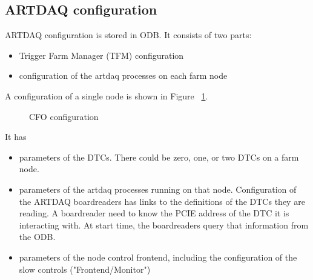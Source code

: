 \subsection{ARTDAQ configuration}

ARTDAQ configuration is stored in ODB. It consists of two parts:
\begin{itemize}
\item
  Trigger Farm Manager (TFM) configuration
\item
  configuration of the artdaq processes on each farm node
\end{itemize}

A configuration of a single node is shown in Figure ~\ref{figure:artdaq_configuration}.

\begin{figure}[H]
  \caption{
    \label{figure:artdaq_configuration}
    CFO configuration
  }
\end{figure}

It has
\begin{itemize}
\item
  parameters of the DTCs. There could be zero, one, or two DTCs on a farm node.
\item
  parameters of the artdaq processes running on that node.
  Configuration of the ARTDAQ boardreaders has links to the definitions
  of the DTCs they are reading. A boardreader need to know the PCIE address of the DTC
  it is interacting with. At start time, the boardreaders query that information
  from the ODB.
  
\item
  parameters of the node control frontend, including the configuration of the
  slow controls ("Frontend/Monitor")
\end{itemize}

